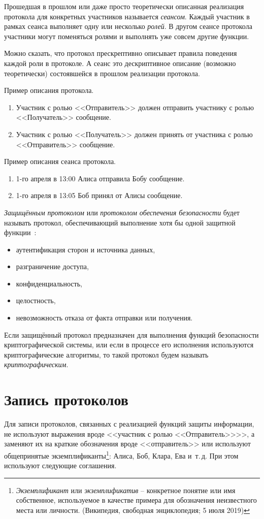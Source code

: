 Прошедшая в прошлом или даже просто теоретически описанная реализация протокола для конкретных участников называется \emph{сеансом}. Каждый участник в рамках сеанса выполняет одну или несколько \emph{ролей}. В другом сеансе протокола участники могут поменяться ролями и выполнять уже совсем другие функции.

Можно сказать, что протокол прескрептивно описывает правила поведения каждой роли в протоколе. А сеанс это дескриптивное описание (возможно теоретически) состоявшейся в прошлом реализации протокола.

Пример описания протокола.
\begin{enumerate}
	\item Участник с ролью <<Отправитель>> должен отправить участнику с ролью <<Получатель>> сообщение.
	\item Участник с ролью <<Получатель>> должен принять от участника с ролью <<Отправитель>> сообщение.
\end{enumerate}

Пример описания сеанса протокола.
\begin{enumerate}
	\item 1-го апреля в 13:00 Алиса отправила Бобу сообщение.
	\item 1-го апреля в 13:05 Боб принял от Алисы сообщение.
\end{enumerate}

\emph{Защищённым протоколом} или \emph{протоколом обеспечения безопасности} будет называть протокол, обеспечивающий выполнение хотя бы одной защитной функции~\cite{ISO:7498-2:1989}:
\begin{itemize}
	\item аутентификация сторон и источника данных,
	\item разграничение доступа,
	\item конфиденциальность,
	\item целостность,
	\item невозможность отказа от факта отправки или получения.
\end{itemize}

Если защищённый протокол предназначен для выполнения функций безопасности криптографической системы, или если в процессе его исполнения используются криптографические алгоритмы, то такой протокол будем называть \emph{криптографическим}.

\section{Запись протоколов}
Для записи протоколов, связанных с реализацией функций защиты информации, не используют выражения вроде <<участник с ролью <<Отправитель>>>>, а заменяют их на краткие обозначения вроде <<отправитель>> или используют общепринятые экземплификанты\footnote{\emph{Экземплификант} или \emph{экземплификатив} -- конкретное понятие или имя собственное, используемое в качестве примера для обозначения неизвестного места или личности. (Википедия, свободная энциклопедия; 5 июля 2019)}: Алиса, Боб, Клара, Ева и~т.\,д. При этом используют следующие соглашения.


